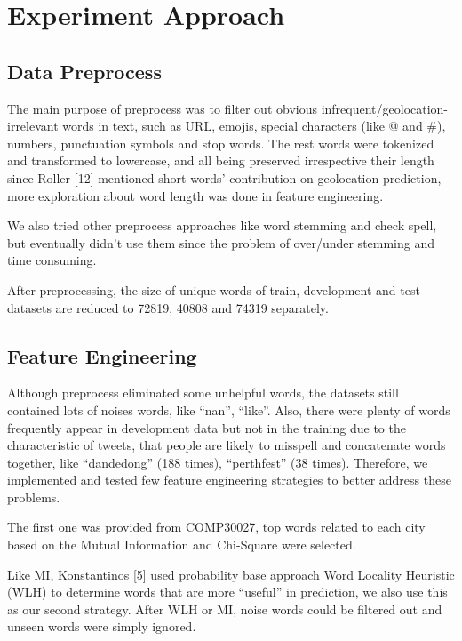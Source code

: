 \documentclass[11pt]{article}
\begin{document}
\section{Experiment Approach}

\subsection{Data Preprocess}

The main purpose of preprocess was to filter out obvious infrequent/geolocation-irrelevant words in text, such as URL, emojis, special characters (like @ and \#), numbers, punctuation symbols and stop words. The rest words were tokenized and transformed to lowercase, and all being preserved irrespective their length since Roller [12] mentioned short words’ contribution on geolocation prediction, more exploration about word length was done in feature engineering. 

We also tried other preprocess approaches like word stemming and check spell, but eventually didn’t use them since the problem of over/under stemming and time consuming. 

After preprocessing, the size of unique words of train, development and test datasets are reduced to 72819, 40808 and 74319 separately.
 
\subsection{Feature Engineering}

Although preprocess eliminated some unhelpful words, the datasets still contained lots of noises words, like “nan”, “like”. Also, there were plenty of words frequently appear in development data but not in the training due to the characteristic of tweets, that people are likely to misspell and concatenate words together, like “dandedong” (188 times), “perthfest” (38 times). Therefore, we implemented and tested few feature engineering strategies to better address these problems.

The first one was provided from COMP30027, top words related to each city based on the Mutual Information and Chi-Square were selected.

Like MI, Konstantinos [5] used probability base approach Word Locality Heuristic (WLH) to determine words that are more “useful” in prediction, we also use this as our second strategy. After WLH or MI, noise words could be filtered out and unseen words were simply ignored.
\end{document}
